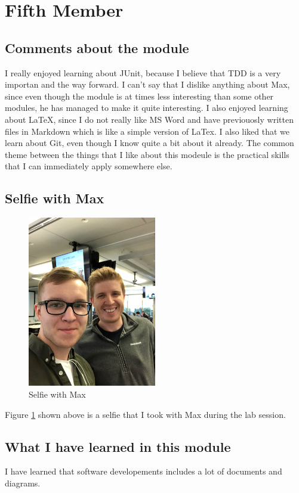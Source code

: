 \section{Fifth Member}

\subsection{Comments about the module}
I really enjoyed learning about JUnit, because I believe that TDD is a very importan and the way forward. I can't say that I dislike anything about Max, since even though the module is at times less interesting than some other modules, he has managed to make it quite interesting. I also enjoyed learning about LaTeX, since I do not really like MS Word and have previouosly written files in Markdown which is like a simple version of LaTex. I also liked that we learn about Git, even though I know quite a bit about it already. The common theme between the things that I like about this modeule is the practical skills that I can immediately apply somewhere else.

\subsection{Selfie with Max}

\begin{figure}[h]
\centering
\includegraphics[width=0.5\textwidth, angle=270]{../images/raigo_max_selfie.JPG}
\caption{Selfie with Max}
\label{fig:selfie5}
\end{figure}

Figure \ref{fig:selfie5} shown above is a selfie that I took with Max during the lab session.

\subsection{What I have learned in this module}
I have learned that software developements includes a lot of documents and diagrams.
